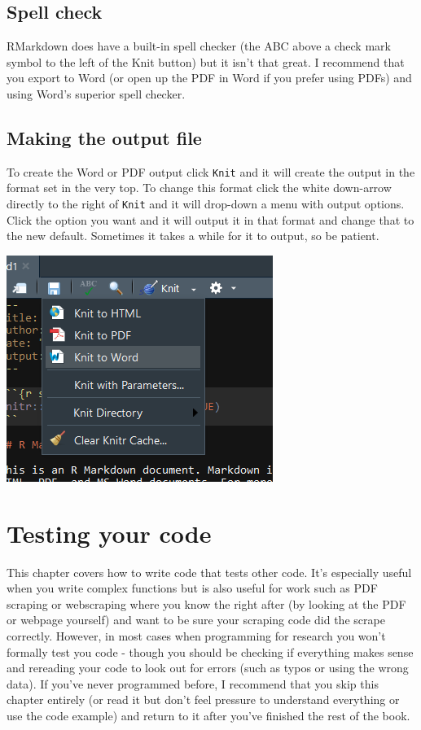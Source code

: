 \documentclass[
]{krantz}
\begin{document}
\hypertarget{spell-check}{%
\section{Spell check}\label{spell-check}}

RMarkdown does have a built-in spell checker (the ABC above a check mark symbol to the left of the Knit button) but it isn't that great. I recommend that you export to Word (or open up the PDF in Word if you prefer using PDFs) and using Word's superior spell checker.

\hypertarget{making-the-output-file}{%
\section{Making the output file}\label{making-the-output-file}}

To create the Word or PDF output click \texttt{Knit} and it will create the output in the format set in the very top. To change this format click the white down-arrow directly to the right of \texttt{Knit} and it will drop-down a menu with output options. Click the option you want and it will output it in that format and change that to the new default. Sometimes it takes a while for it to output, so be patient.

\includegraphics{images/markdown4.PNG}

\hypertarget{tests}{%
\chapter{Testing your code}\label{tests}}

This chapter covers how to write code that tests other code. It's especially useful when you write complex functions but is also useful for work such as PDF scraping or webscraping where you know the right after (by looking at the PDF or webpage yourself) and want to be sure your scraping code did the scrape correctly. However, in most cases when programming for research you won't formally test you code - though you should be checking if everything makes sense and rereading your code to look out for errors (such as typos or using the wrong data). If you've never programmed before, I recommend that you skip this chapter entirely (or read it but don't feel pressure to understand everything or use the code example) and return to it after you've finished the rest of the book.
\end{document}
